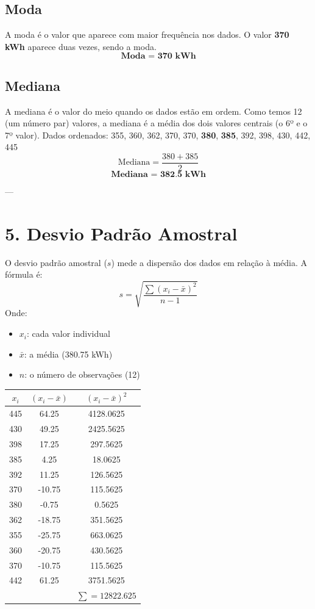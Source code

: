 \documentclass{article}
\begin{document}
\subsection*{Moda}

A moda é o valor que aparece com maior frequência nos dados.
O valor \textbf{370 kWh} aparece duas vezes, sendo a moda.
$$ \textbf{Moda = 370 kWh} $$

\subsection*{Mediana}

A mediana é o valor do meio quando os dados estão em ordem. Como temos 12 (um número par) valores, a mediana é a média dos dois valores centrais (o 6º e o 7º valor).
Dados ordenados: 355, 360, 362, 370, 370, \textbf{380}, \textbf{385}, 392, 398, 430, 442, 445
$$ \text{Mediana} = \frac{380 + 385}{2} $$
$$ \textbf{Mediana = 382.5 kWh} $$

---

\section*{5. Desvio Padrão Amostral}

O desvio padrão amostral ($s$) mede a dispersão dos dados em relação à média.
A fórmula é:
$$ s = \sqrt{\frac{\sum(x_i - \bar{x})^2}{n-1}} $$
Onde:
\begin{itemize}
    \item $x_i$: cada valor individual
    \item $\bar{x}$: a média (380.75 kWh)
    \item $n$: o número de observações (12)
\end{itemize}

\begin{tabular}{|c|c|c|}
    \hline
    \textbf{$x_i$} & \textbf{$(x_i - \bar{x})$} & \textbf{$(x_i - \bar{x})^2$} \\
    \hline
    445 & 64.25 & 4128.0625 \\
    430 & 49.25 & 2425.5625 \\
    398 & 17.25 & 297.5625 \\
    385 & 4.25 & 18.0625 \\
    392 & 11.25 & 126.5625 \\
    370 & -10.75 & 115.5625 \\
    380 & -0.75 & 0.5625 \\
    362 & -18.75 & 351.5625 \\
    355 & -25.75 & 663.0625 \\
    360 & -20.75 & 430.5625 \\
    370 & -10.75 & 115.5625 \\
    442 & 61.25 & 3751.5625 \\
    \hline
    \textbf{} & \textbf{} & $\sum = 12822.625$ \\
    \hline
\end{tabular}
\end{document}
